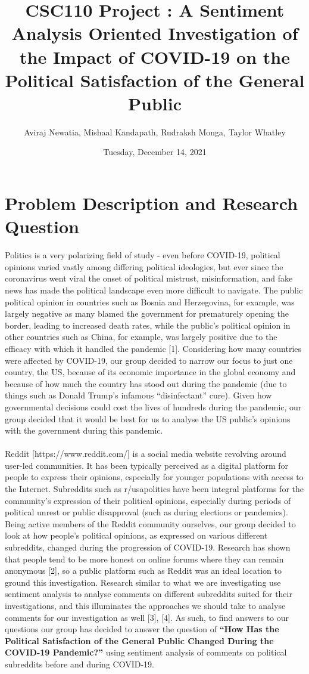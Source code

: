 \documentclass[fontsize=11pt]{article}
\title{CSC110 Project : A Sentiment Analysis Oriented Investigation of the Impact of COVID-19 on the Political Satisfaction of the General Public}
\author{Aviraj Newatia, Mishaal Kandapath, Rudraksh Monga, Taylor Whatley}
\date{Tuesday, December 14, 2021}
\begin{document}
\maketitle

\section*{Problem Description and Research Question}

Politics is a very polarizing field of study - even before COVID-19, political opinions varied vastly among differing political ideologies, but ever since the coronavirus went viral the onset of political mistrust, misinformation, and fake news has made the political landscape even more difficult to navigate. The public political opinion in countries such as Bosnia and Herzegovina, for example, was largely negative as many blamed the government for prematurely opening the border, leading to increased death rates, while the public’s political opinion in other countries such as China, for example, was largely positive due to the efficacy with which it handled the pandemic [1]. Considering how many countries were affected by COVID-19, our group decided to narrow our focus to just one country, the US, because of its economic importance in the global economy and because of how much the country has stood out during the pandemic (due to things such as Donald Trump’s infamous “disinfectant” cure). Given how governmental decisions could cost the lives of hundreds during the pandemic, our group decided that it would be best for us to analyse the US public’s opinions with the government during this pandemic. 
\\\\
Reddit [https://www.reddit.com/] is a social media website revolving around user-led communities. It has been typically perceived as a digital platform for people to express their opinions, especially for younger populations with access to the Internet. Subreddits such as r/usapolitics have been integral platforms for the community’s expression of their political opinions, especially during periods of political unrest or public disapproval (such as during elections or pandemics). Being active members of the Reddit community ourselves, our group decided to look at how people’s political opinions, as expressed on various different subreddits, changed during the progression of COVID-19. Research has shown that people tend to be more honest on online forums where they can remain anonymous [2], so a public platform such as Reddit was an ideal location to ground this investigation. Research similar to what we are investigating use sentiment analysis to analyse comments on different subreddits suited for their investigations, and this illuminates the approaches we should take to analyse comments for our investigation as well [3], [4]. As such, to find answers to our questions our group has decided to answer the question of \textbf{“How Has the Political Satisfaction of the General Public Changed During the COVID-19 Pandemic?”} using sentiment analysis of comments on political subreddits before and during COVID-19.
\end{document}
